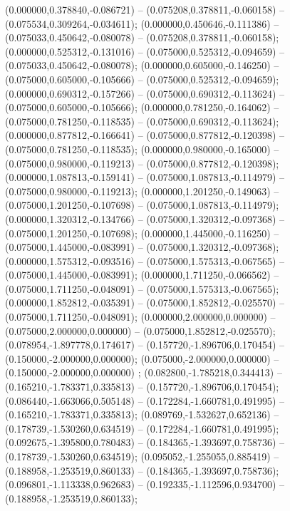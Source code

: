  (0.000000,0.378840,-0.086721) -- (0.075208,0.378811,-0.060158) -- (0.075534,0.309264,-0.034611);
 (0.000000,0.450646,-0.111386) -- (0.075033,0.450642,-0.080078) -- (0.075208,0.378811,-0.060158);
 (0.000000,0.525312,-0.131016) -- (0.075000,0.525312,-0.094659) -- (0.075033,0.450642,-0.080078);
 (0.000000,0.605000,-0.146250) -- (0.075000,0.605000,-0.105666) -- (0.075000,0.525312,-0.094659);
 (0.000000,0.690312,-0.157266) -- (0.075000,0.690312,-0.113624) -- (0.075000,0.605000,-0.105666);
 (0.000000,0.781250,-0.164062) -- (0.075000,0.781250,-0.118535) -- (0.075000,0.690312,-0.113624);
 (0.000000,0.877812,-0.166641) -- (0.075000,0.877812,-0.120398) -- (0.075000,0.781250,-0.118535);
 (0.000000,0.980000,-0.165000) -- (0.075000,0.980000,-0.119213) -- (0.075000,0.877812,-0.120398);
 (0.000000,1.087813,-0.159141) -- (0.075000,1.087813,-0.114979) -- (0.075000,0.980000,-0.119213);
 (0.000000,1.201250,-0.149063) -- (0.075000,1.201250,-0.107698) -- (0.075000,1.087813,-0.114979);
 (0.000000,1.320312,-0.134766) -- (0.075000,1.320312,-0.097368) -- (0.075000,1.201250,-0.107698);
 (0.000000,1.445000,-0.116250) -- (0.075000,1.445000,-0.083991) -- (0.075000,1.320312,-0.097368);
 (0.000000,1.575312,-0.093516) -- (0.075000,1.575313,-0.067565) -- (0.075000,1.445000,-0.083991);
 (0.000000,1.711250,-0.066562) -- (0.075000,1.711250,-0.048091) -- (0.075000,1.575313,-0.067565);
 (0.000000,1.852812,-0.035391) -- (0.075000,1.852812,-0.025570) -- (0.075000,1.711250,-0.048091);
 (0.000000,2.000000,0.000000) -- (0.075000,2.000000,0.000000) -- (0.075000,1.852812,-0.025570);
 (0.078954,-1.897778,0.174617) -- (0.157720,-1.896706,0.170454) -- (0.150000,-2.000000,0.000000);
 (0.075000,-2.000000,0.000000) -- (0.150000,-2.000000,0.000000) ;
 (0.082800,-1.785218,0.344413) -- (0.165210,-1.783371,0.335813) -- (0.157720,-1.896706,0.170454);
 (0.086440,-1.663066,0.505148) -- (0.172284,-1.660781,0.491995) -- (0.165210,-1.783371,0.335813);
 (0.089769,-1.532627,0.652136) -- (0.178739,-1.530260,0.634519) -- (0.172284,-1.660781,0.491995);
 (0.092675,-1.395800,0.780483) -- (0.184365,-1.393697,0.758736) -- (0.178739,-1.530260,0.634519);
 (0.095052,-1.255055,0.885419) -- (0.188958,-1.253519,0.860133) -- (0.184365,-1.393697,0.758736);
 (0.096801,-1.113338,0.962683) -- (0.192335,-1.112596,0.934700) -- (0.188958,-1.253519,0.860133);

